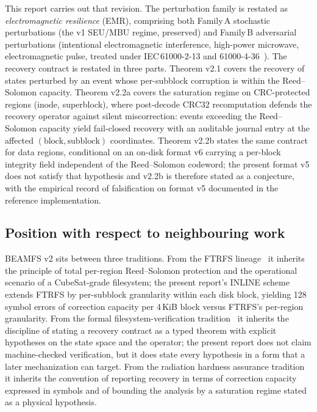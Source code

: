 This report carries out that revision. The perturbation family is
restated as \emph{electromagnetic resilience} (EMR), comprising
both Family\,A stochastic perturbations (the v1 SEU/MBU regime,
preserved) and Family\,B adversarial perturbations (intentional
electromagnetic interference, high-power microwave, electromagnetic
pulse, treated under IEC\,61000-2-13 and
61000-4-36~\cite{iec61000-2-13,iec61000-4-36,radasky2004iemi}).
The recovery contract is restated in three parts. Theorem v2.1
covers the recovery of states perturbed by an event whose
per-subblock corruption is within the Reed--Solomon capacity.
Theorem v2.2a covers the saturation regime on CRC-protected regions
(inode, superblock), where post-decode CRC32 recomputation defends
the recovery operator against silent miscorrection: events exceeding
the Reed--Solomon capacity yield fail-closed recovery with an
auditable journal entry at the affected
\((\text{block},\text{subblock})\) coordinates. Theorem v2.2b
states the same contract for data regions, conditional on an
on-disk format v6 carrying a per-block integrity field independent
of the Reed--Solomon codeword; the present format v5 does not
satisfy that hypothesis and v2.2b is therefore stated as a
conjecture, with the empirical record of falsification on format v5
documented in the reference implementation.

\subsection{Position with respect to neighbouring work}

BEAMFS v2 sits between three traditions. From the FTRFS
lineage~\cite{fuchs2015ftrfs} it inherits the principle of total
per-region Reed--Solomon protection and the operational scenario
of a CubeSat-grade filesystem; the present report's INLINE scheme
extends FTRFS by per-subblock granularity within each disk block,
yielding 128 symbol errors of correction capacity per 4\,KiB block
versus FTRFS's per-region granularity. From the formal
filesystem-verification tradition~\cite{chen2015fscq,klein2009sel4,sigurbjarnarson2016yggdrasil}
it inherits the discipline of stating a recovery contract as a
typed theorem with explicit hypotheses on the state space and the
operator; the present report does not claim machine-checked
verification, but it does state every hypothesis in a form that a
later mechanization can target. From the radiation hardness
assurance tradition~\cite{nasa-hdbk-4002a,esa-eccs60,milstd882e}
it inherits the convention of reporting recovery in terms of
correction capacity expressed in symbols and of bounding the
analysis by a saturation regime stated as a physical hypothesis.

